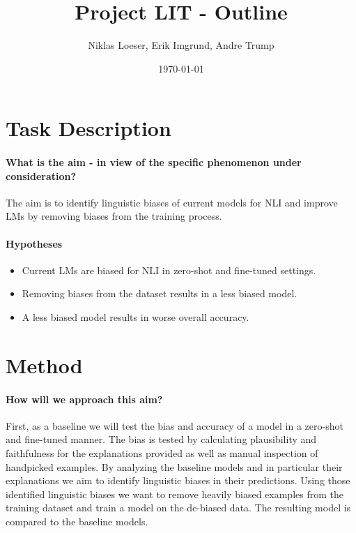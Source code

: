 \documentclass[12pt,a4paper]{article}
\title{Project LIT - Outline}
\author{Niklas Loeser, Erik Imgrund, Andre Trump}
\date{\today}
\begin{document}
\begin{acronym}
\end{acronym}

\maketitle

\section{Task Description}
\paragraph{What is the aim - in view of the specific phenomenon under consideration?}
The aim is to identify linguistic biases of current models for \ac{NLI} and improve \acp{LM} by removing biases from the training process.

\paragraph{Hypotheses}
\begin{itemize}
    \item Current \acp{LM} are biased for \ac{NLI} in zero-shot and fine-tuned settings.
    \item Removing biases from the dataset results in a less biased model.
    \item A less biased model results in worse overall accuracy.
\end{itemize}

\section{Method}
\paragraph{How will we approach this aim?} First, as a baseline we will test the bias and accuracy of a model in a zero-shot and fine-tuned manner. The bias is tested by calculating plausibility and faithfulness \parencite{attanasio2022ferret} for the explanations provided as well as manual inspection of handpicked examples. By analyzing the baseline models and in particular their explanations we aim to identify linguistic biases in their predictions. Using those identified linguistic biases we want to remove heavily biased examples from the training dataset and train a model on the de-biased data. The resulting model is compared to the baseline models.
\end{document}
